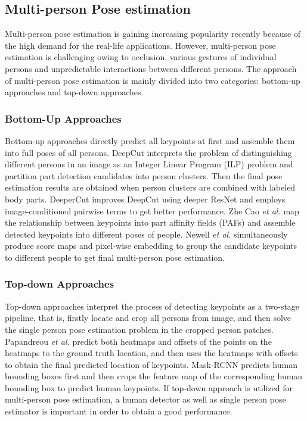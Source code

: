\subsection{Multi-person Pose estimation}
Multi-person pose estimation is gaining increasing popularity recently because of the high demand for the real-life applications.
However, multi-person pose estimation is challenging owing to occlusion, various gestures of individual persons and unpredictable interactions between different persons.
The approach of multi-person pose estimation is mainly divided into two categories: bottom-up approaches and top-down approaches.

\subsubsection{Bottom-Up Approaches}

Bottom-up approaches\cite{newell2017associative, insafutdinov2016deepercut, pishchulin2016deepcut} directly predict all keypoints at first and assemble them into full poses of all persons.
DeepCut\cite{pishchulin2016deepcut} interprets the problem of distinguishing different persons in an image as an Integer Linear Program (ILP) problem and partition
part detection candidates into person clusters.
Then the final pose estimation results are obtained when person clusters are combined with labeled body parts.
DeeperCut\cite{insafutdinov2016deepercut} improves DeepCut\cite{pishchulin2016deepcut} using deeper ResNet\cite{he2016deep} and employs image-conditioned pairwise terms to get better performance.
Zhe Cao \textit{et al.}\cite{cao2016realtime} map the relationship between keypoints into part affinity fields (PAFs) and assemble detected keypoints into different poses of people.
Newell \textit{et al.}\cite{newell2017associative} simultaneously produce score maps and pixel-wise embedding to group the candidate keypoints to different people to get final multi-person pose estimation.

\subsubsection{Top-down Approaches}
Top-down approaches\cite{huang2017coarse, papandreou2017towards, he2017mask} interpret the process of detecting keypoints as a two-stage pipeline, that is, firstly locate and crop all persons from image,
and then solve the single person pose estimation problem in the cropped person patches.
Papandreou \textit{et al.}\cite{papandreou2017towards} predict both heatmaps and offsets of the points on the heatmaps to the ground truth location, and then uses the heatmaps with offsets to obtain the final predicted location of keypoints.
Mask-RCNN\cite{he2017mask} predicts human bounding boxes first and then crops the feature map of the corresponding human bounding box to predict human keypoints.
If top-down approach is utilized for multi-person pose estimation, a human detector as well as single person pose estimator is important in order to obtain a good performance.

